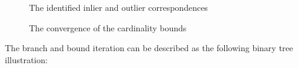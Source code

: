 \documentclass[paper=a4, fontsize=11pt]{scrartcl} %
\numberwithin{equation}{section} %
\numberwithin{figure}{section} %
\numberwithin{table}{section} %
\begin{document}
\begin{figure}[h]
\caption{The identified inlier and outlier correspondences\label{fig:simple}}
\noindent{}
\end{figure} 

\begin{figure}[H]
\caption{The convergence of the cardinality bounds\label{fig:simple}}
\noindent{}
\end{figure} 

\pagebreak

The branch and bound iteration can be described as the following binary tree illustration:
\end{document}

